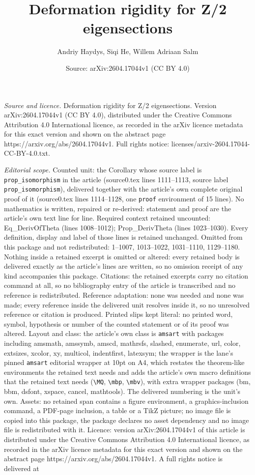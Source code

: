 \documentclass[10pt,a4paper]{amsart}
\title[Deformation rigidity for Z/2 eigensections]{Deformation rigidity for Z/2 eigensections}
\author{Andriy Haydys, Siqi He, Willem Adriaan Salm}
\date{Source: arXiv:2604.17044v1 (CC BY 4.0)}
\begin{document}
\maketitle

\noindent\emph{Source and licence.} Deformation rigidity for Z/2 eigensections. Version arXiv:2604.17044v1 (CC BY 4.0), distributed under the Creative Commons Attribution 4.0 International licence, as recorded in the arXiv licence metadata for this exact version and shown on the abstract page https://arxiv.org/abs/2604.17044v1. Full rights notice: licenses/arxiv-2604.17044-CC-BY-4.0.txt.\par\smallskip

\noindent\textit{Editorial scope.} Counted unit: the Corollary whose source label is \texttt{prop\_isomorphism} in the article (source0.tex lines 1111--1113, source label \texttt{prop\_isomorphism}), delivered together with the article's own complete original proof of it (source0.tex lines 1114--1128, one \texttt{proof} environment of 15 lines). No mathematics is written, repaired or re-derived: statement and proof are the article's own text line for line. Required context retained uncounted: Eq\_DerivOfTheta (lines 1008--1012); Prop\_DerivTheta (lines 1023--1030). Every definition, display and label of those lines is retained unchanged. Omitted from this package and not redistributed: 1--1007, 1013--1022, 1031--1110, 1129--1180. Nothing inside a retained excerpt is omitted or altered: every retained body is delivered exactly as the article's lines are written, so no omission receipt of any kind accompanies this package. Citations: the retained excerpts carry no citation command at all, so no bibliography entry of the article is transcribed and no reference is redistributed. Reference adaptation: none was needed and none was made; every reference inside the delivered unit resolves inside it, so no unresolved reference or citation is produced. Printed slips kept literal: no printed word, symbol, hypothesis or number of the counted statement or of its proof was altered. Layout and class: the article's own class is \texttt{amsart} with packages including amsmath, amssymb, amscd, mathrsfs, slashed, enumerate, url, color, extsizes, xcolor, xy, multicol, indentfirst, latexsym; the wrapper is the lane's pinned \texttt{amsart} editorial wrapper at 10pt on A4, which restates the theorem-like environments the retained text needs and adds the article's own macro definitions that the retained text needs (\texttt{\textbackslash MQ}, \texttt{\textbackslash mbp}, \texttt{\textbackslash mbv}), with extra wrapper packages (bm, bbm, dsfont, xspace, cancel, mathtools). The delivered numbering is the unit's own. Assets: no retained span contains a figure environment, a graphics-inclusion command, a PDF-page inclusion, a table or a TikZ picture; no image file is copied into this package, the package declares no asset dependency and no image file is redistributed with it. Licence: version arXiv:2604.17044v1 of this article is distributed under the Creative Commons Attribution 4.0 International licence, as recorded in the arXiv licence metadata for this exact version and shown on the abstract page https://arxiv.org/abs/2604.17044v1. A full rights notice is delivered at 
\end{document}
